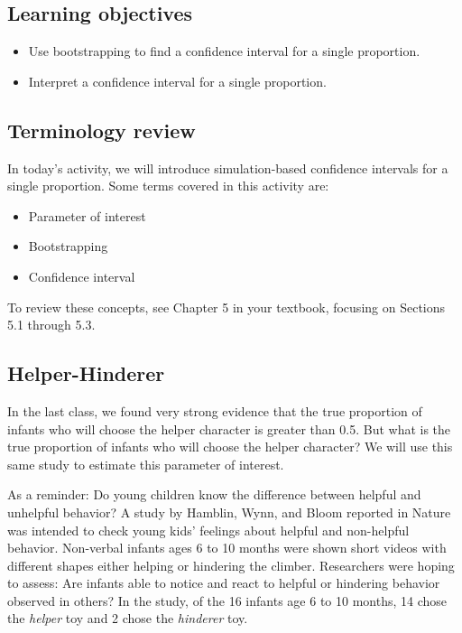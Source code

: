 \documentclass[
]{report}
\begin{document}

\hypertarget{learning-objectives-7}{%
\subsection{Learning objectives}\label{learning-objectives-7}}

\begin{itemize}
\item
  Use bootstrapping to find a confidence interval for a single proportion.
\item
  Interpret a confidence interval for a single proportion.
\end{itemize}

\hypertarget{terminology-review-11}{%
\subsection{Terminology review}\label{terminology-review-11}}

In today's activity, we will introduce simulation-based confidence intervals for a single proportion. Some terms covered in this activity are:

\begin{itemize}
\item
  Parameter of interest
\item
  Bootstrapping
\item
  Confidence interval
\end{itemize}

To review these concepts, see Chapter 5 in your textbook, focusing on Sections 5.1 through 5.3.

\hypertarget{helper-hinderer-1}{%
\subsection{Helper-Hinderer}\label{helper-hinderer-1}}

In the last class, we found very strong evidence that the true proportion of infants who will choose the helper character is greater than 0.5. But what is the true proportion of infants who will choose the helper character? We will
use this same study to estimate this parameter of interest.

As a reminder: Do young children know the difference between helpful and unhelpful behavior? A study by Hamblin, Wynn, and Bloom reported in Nature was intended to check young kids' feelings about helpful and non-helpful behavior. Non-verbal infants ages 6 to 10 months were shown short videos with different shapes either helping or hindering the climber. Researchers were hoping to assess: Are infants able to notice and react to helpful or hindering behavior observed in others? In the study, of the 16 infants age 6 to 10 months, 14 chose the \emph{helper} toy and 2 chose the \emph{hinderer} toy.
\end{document}
